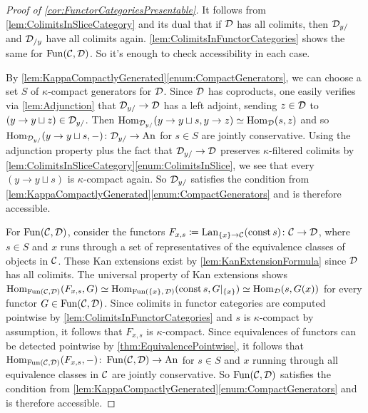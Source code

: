 \begin{proof}[Proof of \cref{cor:FunctorCategoriesPresentable}]
	It follows from \cref{lem:ColimitsInSliceCategory} and its dual that if $\mathcal{D}$ has all colimits, then $\mathcal{D}_{y/}$ and $\mathcal{D}_{/y}$ have all colimits again. \cref{lem:ColimitsInFunctorCategories} shows the same for $\operatorname{Fun}(\mathcal{C},\mathcal{D})$. So it's enough to check accessibility in each case.
	
	By \cref{lem:KappaCompactlyGenerated}\cref{enum:CompactGenerators}, we can choose a set $S$ of $\kappa$-compact generators for $\mathcal{D}$. Since $\mathcal{D}$ has coproducts, one easily verifies via \cref{lem:Adjunction} that $\mathcal{D}_{y/}\rightarrow\mathcal{D}$ has a left adjoint, sending $z\in\mathcal{D}$ to $(y\rightarrow y\sqcup z)\in\mathcal{D}_{y/}$. Then $\operatorname{Hom}_{\mathcal{D}_{y/}}(y\rightarrow y\sqcup s,y\rightarrow z)\simeq \operatorname{Hom}_{\mathcal{D}}(s,z)$ and so $\operatorname{Hom}_{\mathcal{D}_{y/}}(y\rightarrow y\sqcup s,-)\colon \mathcal{D}_{y/}\rightarrow\mathrm{An}$ for $s\in S$ are jointly conservative. Using the adjunction property plus the fact that $\mathcal{D}_{y/}\rightarrow \mathcal{D}$ preserves $\kappa$-filtered colimits by \cref{lem:ColimitsInSliceCategory}\cref{enum:ColimitsInSlice}, we see that every $(y\rightarrow y\sqcup s)$ is $\kappa$-compact again. So $\mathcal{D}_{y/}$ satisfies the condition from \cref{lem:KappaCompactlyGenerated}\cref{enum:CompactGenerators} and is therefore accessible.
	
	For $\operatorname{Fun}(\mathcal{C},\mathcal{D})$, consider the functors $F_{x,s}\coloneqq\operatorname{Lan}_{\{x\}\rightarrow \mathcal{C}}(\operatorname{const} s)\colon \mathcal{C}\rightarrow\mathcal{D}$, where $s\in S$ and $x$ runs through a set of representatives of the equivalence classes of objects in $\mathcal{C}$. These Kan extensions exist by \cref{lem:KanExtensionFormula} since $\mathcal{D}$ has all colimits. The universal property of Kan extensions shows $\operatorname{Hom}_{\operatorname{Fun}(\mathcal{C},\mathcal{D})}(F_{x,s},G)\simeq \operatorname{Hom}_{\operatorname{Fun}(\{x\},\,\mathcal{D})}(\operatorname{const} s,G|_{\{x\}})\simeq \operatorname{Hom}_{\mathcal{D}}(s,G(x))$ for every functor $G\in\operatorname{Fun}(\mathcal{C},\mathcal{D})$. Since colimits in functor categories are computed pointwise by \cref{lem:ColimitsInFunctorCategories} and $s$ is $\kappa$-compact by assumption, it follows that $F_{x,s}$ is $\kappa$-compact. Since equivalences of functors can be detected pointwise by \cref{thm:EquivalencePointwise}, it follows that $\operatorname{Hom}_{\operatorname{Fun}(\mathcal{C},\mathcal{D})}(F_{x,s},-)\colon \operatorname{Fun}(\mathcal{C},\mathcal{D})\rightarrow\mathrm{An}$ for $s\in S$ and $x$ running through all equivalence classes in $\mathcal{C}$ are jointly conservative. So $\operatorname{Fun}(\mathcal{C},\mathcal{D})$ satisfies the condition from \cref{lem:KappaCompactlyGenerated}\cref{enum:CompactGenerators} and is therefore accessible.
	

\end{proof}
